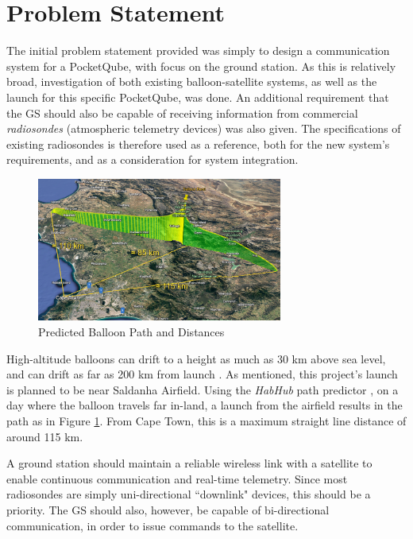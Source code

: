 \graphicspath{{./figures/}}

\section{Problem Statement}

The initial problem statement provided was simply to design a communication system for a \mbox{PocketQube}, with focus on the ground station. As this is relatively broad, investigation of both existing balloon-satellite systems, as well as the launch for this specific PocketQube, was done. An additional requirement that the GS should also be capable of receiving information from commercial \textit{radiosondes} (atmospheric telemetry devices) was also given. The specifications of existing radiosondes is therefore used as a reference, both for the new system's requirements, and as a consideration for system integration.

\begin{figure}[!htb]
  \centering
  \includegraphics[width=0.72\textwidth]{balloon_path_3d}
  \caption{Predicted Balloon Path and Distances}
  \label{fig:balloon_path}
\end{figure}

High-altitude balloons can drift to a height as much as 30 km above sea level, and can drift as far as 200 km from launch \cite{site-weatherWeatherBalloons}. As mentioned, this project's launch is planned to be near Saldanha Airfield. Using the \textit{HabHub} path predictor \cite{site-habHub}, on a day where the balloon travels far in-land, a launch from the airfield results in the path as in Figure \ref{fig:balloon_path}. From Cape Town, this is a maximum straight line distance of around 115 km. 

A ground station should maintain a reliable wireless link with a satellite to enable continuous communication and real-time telemetry. Since most radiosondes are simply uni-directional ``downlink" devices, this should be a priority. The GS should also, however, be capable of bi-directional communication, in order to issue commands to the satellite.
